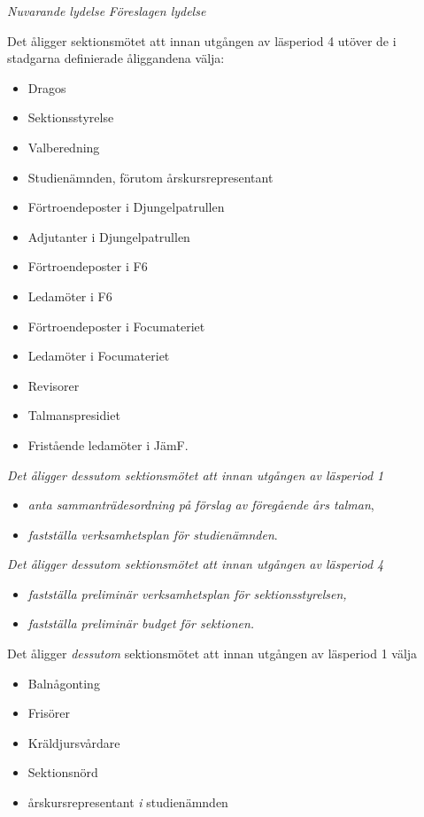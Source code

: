 \documentclass{article}
\newenvironment{lydelse}
    {\begin{paracol}{2}%
        \emph{Nuvarande lydelse}%
        \switchcolumn%
        \emph{Föreslagen lydelse}%
    \end{paracol}%
    \begin{enumerate}[label=\thesubsection.\arabic*]%
    \begin{paracol}{2}%
    }{\end{paracol}\end{enumerate}}
\begin{document}
\begin{lydelse}
	\item Det åligger sektionsmötet att innan utgången av  läsperiod 4 utöver de i stadgarna definierade åliggandena välja:
	\begin{itemize}
		\item Dragos
		\item Sektionsstyrelse
		\item Valberedning
		\item Studienämnden, förutom årskursrepresentant
		\item Förtroendeposter i Djungelpatrullen
		\item Adjutanter i Djungelpatrullen
		\item Förtroendeposter i F6
		\item Ledamöter i F6
		\item Förtroendeposter i Focumateriet
		\item Ledamöter i Focumateriet
		\item Revisorer
		\item Talmanspresidiet
		\item Fristående ledamöter i JämF.
	\end{itemize}
    \setcounter{subsection}{1}
    \switchcolumn
    
    \item \emph{Det åligger dessutom sektionsmötet att innan utgången av läsperiod 1}
    \begin{itemize}
        \item \emph{anta sammanträdesordning på förslag av föregående års talman},
        \item \emph{fastställa verksamhetsplan för studienämnden}.
    \end{itemize}
    
    \item \emph{Det åligger dessutom sektionsmötet att innan utgången av läsperiod 4}
    \begin{itemize}
        \item \emph{fastställa preliminär verksamhetsplan för sektionsstyrelsen,}
        \item \emph{fastställa preliminär budget för sektionen.}
    \end{itemize}
    
    \vspace{0.6em}
    \item Det åligger \emph{dessutom} sektionsmötet att innan utgången av läsperiod 1 välja
    \begin{itemize}
        \item Balnågonting
        \item Frisörer
        \item Kräldjursvårdare
        \item Sektionsnörd
        \item årskursrepresentant \emph{i} studienämnden
    \end{itemize}
    

\end{lydelse}
\end{document}
